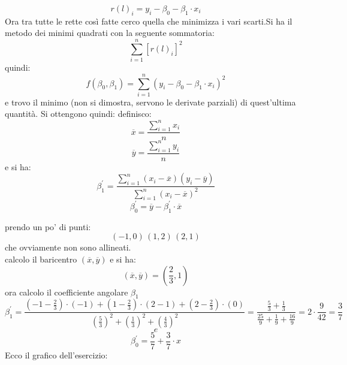 \documentclass[a4paper,12pt, oneside]{book}
\begin{document}
$$r(l)_i=y_i-\beta_0-\beta_1\cdot x_i$$
Ora tra tutte le rette così fatte cerco quella che minimizza i vari scarti.Si ha il metodo dei minimi quadrati con la seguente sommatoria:
$$\sum_{i=1}^n [r(l)_i]^2$$
quindi:
$$f(\beta_0,\beta_1)=\sum_{i=1}^n(y_i-\beta_0-\beta_1\cdot x_i)^2$$
e trovo il minimo (non si dimostra, servono le derivate parziali) di quest'ultima quantità. Si ottengono quindi:
definisco:
$$\overline{x}=\frac{\sum_{i=1}^n x_i}{n}$$
$$\overline{y}=\frac{\sum_{i=1}^n y_i}{n}$$
e si ha:
$$\beta_1^{'}=\frac{\sum_{i=1}^n (x_i-\overline{x})(y_i-\overline{y})}{\sum_{i=1}^n (x_i-\overline{x})^2}$$
$$\beta_0^{'}=\overline{y}-\beta_1^{'}\cdot \overline{x}$$
\newpage
\begin{esempio}
prendo un po' di punti:
$$(-1,0)\,(1,2)\,(2,1)$$
che ovviamente non sono allineati.\\
calcolo il baricentro $(\overline{x},\overline{y})$
e si ha: 
$$(\overline{x},\overline{y})=\left(\frac{2}{3},1\right)$$
ora calcolo il coefficiente angolare $\beta_1$
$$\beta_1^{'}=\frac{(-1-\frac{2}{3})\cdot (-1)+(1-\frac{2}{3})\cdot(2-1)+(2-\frac{2}{3})\cdot(0)}{\left(\frac{5}{3}\right)^2+\left(\frac{1}{3}\right)^2+\left(\frac{4}{3}\right)^2}=\frac{\frac{5}{3}+\frac{1}{3}}{\frac{25}{9}+\frac{1}{9}+\frac{16}{9}}=2\cdot\frac{9}{42}=\frac{3}{7}$$
$$e$$ 
$$\beta_0^{'}=\frac{5}{7}+\frac{3}{7}\cdot x$$
Ecco il grafico dell'esercizio:
\begin{center}
\end{center}
\end{esempio}
\newpage
\end{document}
